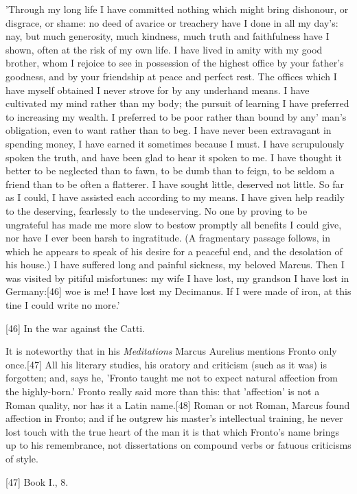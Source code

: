 'Through my long life I have committed nothing which might bring
dishonour, or disgrace, or shame: no deed of avarice or treachery have I
done in all my day's: nay, but much generosity, much kindness, much truth
and faithfulness have I shown, often at the risk of my own life. I have
lived in amity with my good brother, whom I rejoice to see in possession
of the highest office by your father's goodness, and by your friendship at
peace and perfect rest. The offices which I have myself obtained I never
strove for by any underhand means. I have cultivated my mind rather than
my body; the pursuit of learning I have preferred to increasing my wealth.
I preferred to be poor rather than bound by any' man's obligation, even to
want rather than to beg. I have never been extravagant in spending money,
I have earned it sometimes because I must. I have scrupulously spoken the
truth, and have been glad to hear it spoken to me. I have thought it
better to be neglected than to fawn, to be dumb than to feign, to be
seldom a friend than to be often a flatterer. I have sought little,
deserved not little. So far as I could, I have assisted each according to
my means. I have given help readily to the deserving, fearlessly to the
undeserving. No one by proving to be ungrateful has made me more slow to
bestow promptly all benefits I could give, nor have I ever been harsh to
ingratitude. (A fragmentary passage follows, in which he appears to speak
of his desire for a peaceful end, and the desolation of his house.) I have
suffered long and painful sickness, my beloved Marcus. Then I was visited
by pitiful misfortunes: my wife I have lost, my grandson I have lost in
Germany:[46]
woe is me! I have lost my Decimanus. If I were made of iron, at this tine
I could write no more.'

[46]
In the war against the Catti.

It is noteworthy that in his \emph{Meditations} Marcus Aurelius mentions Fronto
only once.[47]
All his literary studies, his oratory and criticism (such as it was) is
forgotten; and, says he, 'Fronto taught me not to expect natural
affection from the highly-born.' Fronto really said more than this: that
'affection' is not a Roman quality, nor has it a Latin name.[48]
Roman or not Roman, Marcus found affection in Fronto; and if he outgrew
his master's intellectual training, he never lost touch with the true
heart of the man it is that which Fronto's name brings up to his
remembrance, not dissertations on compound verbs or fatuous criticisms of
style.

[47]
Book I., 8.


